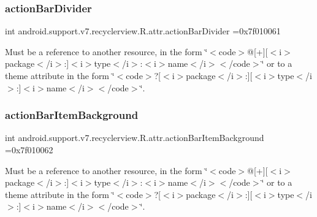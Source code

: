 \subsubsection{\texorpdfstring{action\+Bar\+Divider}{actionBarDivider}}
{\footnotesize\ttfamily int android.\+support.\+v7.\+recyclerview.\+R.\+attr.\+action\+Bar\+Divider =0x7f010061\hspace{0.3cm}{\ttfamily [static]}}

Must be a reference to another resource, in the form \char`\"{}$<$code$>$@\mbox{[}+\mbox{]}\mbox{[}$<$i$>$package$<$/i$>$\+:\mbox{]}$<$i$>$type$<$/i$>$\+:$<$i$>$name$<$/i$>$$<$/code$>$\char`\"{} or to a theme attribute in the form \char`\"{}$<$code$>$?\mbox{[}$<$i$>$package$<$/i$>$\+:\mbox{]}\mbox{[}$<$i$>$type$<$/i$>$\+:\mbox{]}$<$i$>$name$<$/i$>$$<$/code$>$\char`\"{}. \mbox{\label{classandroid_1_1support_1_1v7_1_1recyclerview_1_1R_1_1attr_a406fd2429683cd4b5d928c3630add1ae}} 
\subsubsection{\texorpdfstring{action\+Bar\+Item\+Background}{actionBarItemBackground}}
{\footnotesize\ttfamily int android.\+support.\+v7.\+recyclerview.\+R.\+attr.\+action\+Bar\+Item\+Background =0x7f010062\hspace{0.3cm}{\ttfamily [static]}}

Must be a reference to another resource, in the form \char`\"{}$<$code$>$@\mbox{[}+\mbox{]}\mbox{[}$<$i$>$package$<$/i$>$\+:\mbox{]}$<$i$>$type$<$/i$>$\+:$<$i$>$name$<$/i$>$$<$/code$>$\char`\"{} or to a theme attribute in the form \char`\"{}$<$code$>$?\mbox{[}$<$i$>$package$<$/i$>$\+:\mbox{]}\mbox{[}$<$i$>$type$<$/i$>$\+:\mbox{]}$<$i$>$name$<$/i$>$$<$/code$>$\char`\"{}. \mbox{\label{classandroid_1_1support_1_1v7_1_1recyclerview_1_1R_1_1attr_ad72ccd341f4d93e155e71cf654f5e7a4}} 
